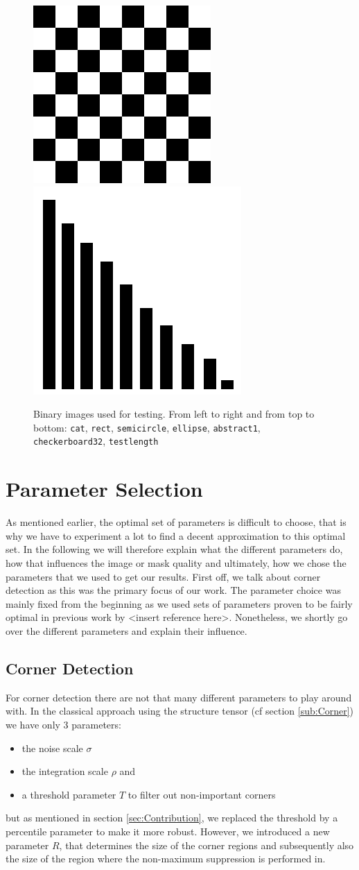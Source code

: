 \begin{figure}[ht]
    \includegraphics[width=0.32\linewidth]{../../images/binary/checkerboard32.png}
    \includegraphics[width=0.32\linewidth]{../../images/binary/testlength.png}
    \caption{Binary images used for testing. From left to right and from top to bottom:
        \texttt{cat}, \texttt{rect},
    \texttt{semicircle}, \texttt{ellipse}, \texttt{abstract1}, \texttt{checkerboard32},
\texttt{testlength}}\label{fig:BinaryImg}
\end{figure}
\section{Parameter Selection}
As mentioned earlier, the optimal set of parameters is difficult to choose, that is why we have to
experiment a lot to find a decent approximation to this optimal set. In the following we will
therefore explain what the different parameters do, how that influences the image or mask quality
and ultimately, how we chose the parameters that we used to get our results.
First off, we talk about corner detection as this was the primary focus of our work. The parameter
choice was mainly fixed from the beginning as we used sets of parameters proven to be fairly
optimal in previous work by {<insert reference here>}. Nonetheless, we shortly go over the different
parameters and explain their influence.
\subsection{Corner Detection}
For corner detection there are not that many different parameters to play around with. In the
classical approach using the structure tensor (cf section \ref{sub:Corner}) we have only 3
parameters:
\begin{itemize}
    \item the noise scale $\sigma$
    \item the integration scale $\rho$ and
    \item a threshold parameter $T$ to filter out non-important corners
\end{itemize}
but as mentioned in section \ref{sec:Contribution}, we replaced the threshold by a percentile
parameter to make it more robust.
However, we introduced a new parameter $R$, that determines the size of the corner regions and
subsequently also the size of the region where the non-maximum suppression is performed in.

